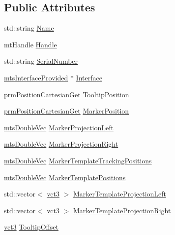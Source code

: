 \subsection*{Public Attributes}
\begin{DoxyCompactItemize}
\item 
std\-::string \hyperlink{classmts_micron_tracker_1_1_tool_a99366ed64e7a289aafe66e76b467614e}{Name}
\item 
mt\-Handle \hyperlink{classmts_micron_tracker_1_1_tool_ac1c53444059f0036ee818712b65cbff7}{Handle}
\item 
std\-::string \hyperlink{classmts_micron_tracker_1_1_tool_a474f21c01419e5afa938b1a6e0c27257}{Serial\-Number}
\item 
\hyperlink{classmts_interface_provided}{mts\-Interface\-Provided} $\ast$ \hyperlink{classmts_micron_tracker_1_1_tool_a883c18723a43e2096ccbaf852b3ee41c}{Interface}
\item 
\hyperlink{classprm_position_cartesian_get}{prm\-Position\-Cartesian\-Get} \hyperlink{classmts_micron_tracker_1_1_tool_a053af3e76832fc8cf0df4dc188e0ce8f}{Tooltip\-Position}
\item 
\hyperlink{classprm_position_cartesian_get}{prm\-Position\-Cartesian\-Get} \hyperlink{classmts_micron_tracker_1_1_tool_a2486620c5bf0ba342b737e5cccd4a154}{Marker\-Position}
\item 
\hyperlink{mts_vector_8h_af69167a5dc2ad33eb93965b9387d8403}{mts\-Double\-Vec} \hyperlink{classmts_micron_tracker_1_1_tool_a59cb72f20ac245239df66769dbbd9f00}{Marker\-Projection\-Left}
\item 
\hyperlink{mts_vector_8h_af69167a5dc2ad33eb93965b9387d8403}{mts\-Double\-Vec} \hyperlink{classmts_micron_tracker_1_1_tool_a217bdf4e30bcba4eff9e7c4b5cfd84cd}{Marker\-Projection\-Right}
\item 
\hyperlink{mts_vector_8h_af69167a5dc2ad33eb93965b9387d8403}{mts\-Double\-Vec} \hyperlink{classmts_micron_tracker_1_1_tool_ad134bdb9be08a36e4a6b27f495ca920c}{Marker\-Template\-Tracking\-Positions}
\item 
\hyperlink{mts_vector_8h_af69167a5dc2ad33eb93965b9387d8403}{mts\-Double\-Vec} \hyperlink{classmts_micron_tracker_1_1_tool_a1e2a36128f209ec70189e28502dbba67}{Marker\-Template\-Positions}
\item 
std\-::vector$<$ \hyperlink{vct_fixed_size_vector_types_8h_a3af82acdbf4eeb73c551909240b106ea}{vct3} $>$ \hyperlink{classmts_micron_tracker_1_1_tool_ad9b305c6ed8d81c2715cfdd7161ed146}{Marker\-Template\-Projection\-Left}
\item 
std\-::vector$<$ \hyperlink{vct_fixed_size_vector_types_8h_a3af82acdbf4eeb73c551909240b106ea}{vct3} $>$ \hyperlink{classmts_micron_tracker_1_1_tool_aa940a71dbf55cb85b2bf5681dd57c91e}{Marker\-Template\-Projection\-Right}
\item 
\hyperlink{vct_fixed_size_vector_types_8h_a3af82acdbf4eeb73c551909240b106ea}{vct3} \hyperlink{classmts_micron_tracker_1_1_tool_a661b9476c03d797ce5800bc887a35ceb}{Tooltip\-Offset}
\end{DoxyCompactItemize}


